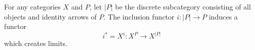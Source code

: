For any categories $X$ and $P$, let $|P|$ be the discrete subcategory consisting of all objects and identity arrows of $P$. The inclusion functor $i : |P| \rightarrow P$ induces a functor
$$i^* = X^i : X^P \rightarrow X^{|P|}$$
which creates limits.
